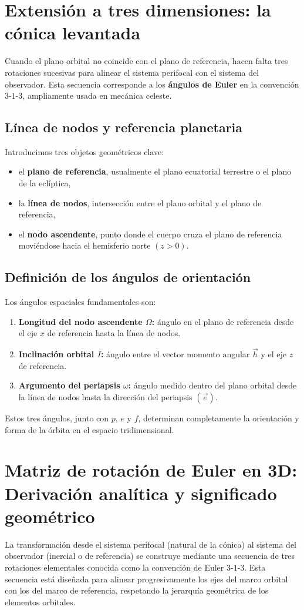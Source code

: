 \section{Extensión a tres dimensiones: la cónica levantada}
Cuando el plano orbital no coincide con el plano de referencia, hacen falta tres rotaciones sucesivas para alinear el sistema perifocal con el sistema del observador. Esta secuencia corresponde a los \textbf{ángulos de Euler} en la convención \(3\)-\(1\)-\(3\), ampliamente usada en mecánica celeste.

\subsection{Línea de nodos y referencia planetaria}
Introducimos tres objetos geométricos clave:
\begin{itemize}
    \item el \textbf{plano de referencia}, usualmente el plano ecuatorial terrestre o el plano de la eclíptica,
    \item la \textbf{línea de nodos}, intersección entre el plano orbital y el plano de referencia,
    \item el \textbf{nodo ascendente}, punto donde el cuerpo cruza el plano de referencia moviéndose hacia el hemisferio norte \((z>0)\).
\end{itemize}

\subsection{Definición de los ángulos de orientación}
Los ángulos espaciales fundamentales son:
\begin{enumerate}
    \item \textbf{Longitud del nodo ascendente \(\Omega\):} ángulo en el plano de referencia desde el eje \(x\) de referencia hasta la línea de nodos.
    \item \textbf{Inclinación orbital \(I\):} ángulo entre el vector momento angular \(\vec{h}\) y el eje \(z\) de referencia.
    \item \textbf{Argumento del periapsis \(\omega\):} ángulo medido dentro del plano orbital desde la línea de nodos hasta la dirección del periapsis \((\vec{e})\).
\end{enumerate}

Estos tres ángulos, junto con \(p\), \(e\) y \(f\), determinan completamente la orientación y forma de la órbita en el espacio tridimensional.

\section{Matriz de rotación de Euler en 3D: Derivación analítica y significado geométrico}
La transformación desde el sistema perifocal (natural de la cónica) al sistema del observador (inercial o de referencia) se construye mediante una secuencia de tres rotaciones elementales conocida como la convención de Euler 3-1-3. Esta secuencia está diseñada para alinear progresivamente los ejes del marco orbital con los del marco de referencia, respetando la jerarquía geométrica de los elementos orbitales.

